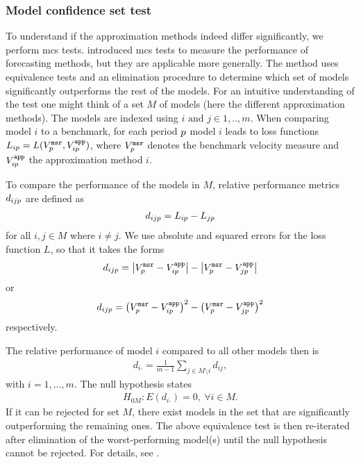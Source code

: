 \subsubsection{Model confidence set test}
\label{sec:results:sub:comp:subsub:mcs}%
To understand if the approximation methods indeed differ significantly, we
perform \acf{mcs} tests.  %
\cite{hansen2011model} introduced \Ac{mcs} tests to measure the performance
of forecasting methods, but they are applicable more generally.  %
The method uses equivalence tests and an elimination procedure to determine
which set of models significantly outperforms the rest of the models.  %
For an intuitive understanding of the test one might think of a set $M$ of
models (here the different approximation methods).  %
The models are indexed using $i \text{ and } j \in 1,..,m $.  %
When comparing model $i$ to a benchmark, for each period ${p}$ model $i$
leads to loss functions
$ L_{i {p}} = L(V^{{\mathtt{msr}}}_{p}, V^{{\mathtt{app}}}_{i {p}})$, where
$V^{{\mathtt{msr}}}_{p}$ denotes the benchmark velocity measure and
$V^{{\mathtt{app}}}_{i {p}}$ the approximation method $i$.

To compare the performance of the models in $M$, relative performance metrics
$d_{ij {p}}$ are defined as %
\begin{align*}
  d_{ij \perd} = L_{i \perd} - L_{j \perd}%
\end{align*}
for all $ i,j \in M $ where $i \neq j $.  %
We use absolute and squared errors for the loss function $L$, so that it takes the forms %
\begin{align*}
  d_{ij \perd} = \bigl| V^{\est}_\perd
  - V^{\app}_{i \perd} \bigr|
  - \bigl| V^{\est}_\perd
  - V^{\app}_{j \perd} \bigr|%
\end{align*}
or
\begin{align*}
  d_{ij \perd} = \bigl( V^{\est}_\perd
  - V^{\app}_{i \perd} \bigr)^{2}
  - \bigl( V^{\est}_\perd
  - V^{\app}_{j \perd} \bigr)^{2}%
\end{align*}
respectively. %

The relative performance of model $i$ compared to all other models then is
\begin{align*}
  d_{i \boldsymbol{\cdot}} = \frac{1}{m-1} \sum_{j \in M \setminus i} d_{ij},%
\end{align*}
with $i = 1,...,m$. %
The null hypothesis states %
\begin{align*}
  H_{0M}: E(d_{i \boldsymbol{\cdot}}) = 0,\ \forall i \in M. %
\end{align*}
If it can be rejected for set $M$, there exist models in the set that are
significantly outperforming the remaining ones.  %
The above equivalence test is then re-iterated after elimination of the
worst-performing model(s) until the null hypothesis cannot be rejected.  %
For details, see \cite{hansen2011model}.

